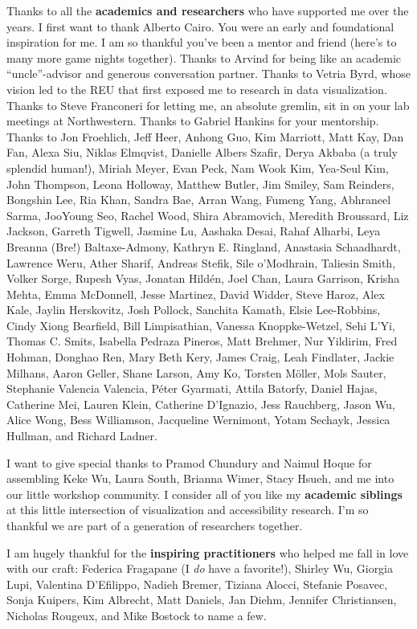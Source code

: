 \documentclass[12pt]{cmuthesis}
\begin{document}
Thanks to all the \textbf{academics and researchers} who have supported me over the years. I first want to thank Alberto Cairo. You were an early and foundational inspiration for me. I am so thankful you've been a mentor and friend (here's to many more game nights together). Thanks to Arvind for being like an academic ``uncle''-advisor and generous conversation partner. Thanks to Vetria Byrd, whose vision led to the REU that first exposed me to research in data visualization. Thanks to Steve Franconeri for letting me, an absolute gremlin, sit in on your lab meetings at Northwestern. Thanks to Gabriel Hankins for your mentorship. Thanks to Jon Froehlich, Jeff Heer, Anhong Guo, Kim Marriott, Matt Kay, Dan Fan, Alexa Siu, Niklas Elmqvist, Danielle Albers Szafir, Derya Akbaba (a truly splendid human!), Miriah Meyer, Evan Peck, Nam Wook Kim, Yea-Seul Kim, John Thompson, Leona Holloway, Matthew Butler, Jim Smiley, Sam Reinders, Bongshin Lee, Ria Khan, Sandra Bae, Arran Wang, Fumeng Yang, Abhraneel Sarma, JooYoung Seo, Rachel Wood, Shira Abramovich, Meredith Broussard, Liz Jackson, Garreth Tigwell, Jasmine Lu, Aashaka Desai, Rahaf Alharbi, Leya Breanna (Bre!) Baltaxe-Admony, Kathryn E. Ringland, Anastasia Schaadhardt, Lawrence Weru, Ather Sharif, Andreas Stefik, Sile o'Modhrain, Taliesin Smith, Volker Sorge, Rupesh Vyas, Jonatan Hildén, Joel Chan, Laura Garrison, Krisha Mehta, Emma McDonnell, Jesse Martinez, David Widder, Steve Haroz, Alex Kale, Jaylin Herskovitz, Josh Pollock, Sanchita Kamath, Elsie Lee-Robbins, Cindy Xiong Bearfield, Bill Limpisathian, Vanessa Knoppke-Wetzel, Sehi L'Yi, Thomas C. Smits, Isabella Pedraza Pineros, Matt Brehmer, Nur Yildirim, Fred Hohman, Donghao Ren, Mary Beth Kery, James Craig, Leah Findlater, Jackie Milhans, Aaron Geller, Shane Larson, Amy Ko, Torsten M\"oller, Mols Sauter, Stephanie Valencia Valencia, Péter Gyarmati, Attila Batorfy, Daniel Hajas, Catherine Mei, Lauren Klein, Catherine D'Ignazio, Jess Rauchberg, Jason Wu, Alice Wong, Bess Williamson, Jacqueline Wernimont, Yotam Sechayk, Jessica Hullman, and Richard Ladner.

I want to give special thanks to Pramod Chundury and Naimul Hoque for assembling Keke Wu, Laura South, Brianna Wimer, Stacy Hsueh, and me into our little workshop community. I consider all of you like my \textbf{academic siblings} at this little intersection of visualization and accessibility research. I'm so thankful we are part of a generation of researchers together.

I am hugely thankful for the \textbf{inspiring practitioners} who helped me fall in love with our craft: Federica Fragapane (I \textit{do} have a favorite!), Shirley Wu, Giorgia Lupi, Valentina D'Efilippo, Nadieh Bremer, Tiziana Alocci, Stefanie Posavec, Sonja Kuipers, Kim Albrecht, Matt Daniels, Jan Diehm, Jennifer Christiansen, Nicholas Rougeux, and Mike Bostock to name a few.
\end{document}
